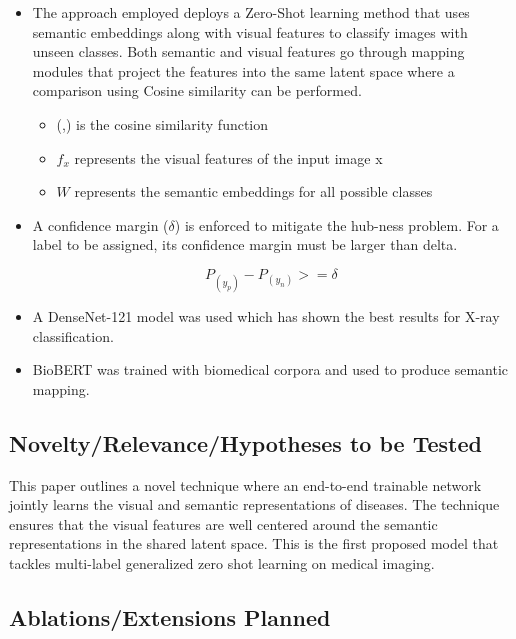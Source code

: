 \documentclass[letterpaper]{article} %
\begin{document}
\begin{itemize}

\item The approach employed deploys a Zero-Shot learning method that uses semantic embeddings along with 
        visual features to classify images with unseen classes. Both semantic and visual features go through mapping modules that project the features into the same latent space where a comparison using Cosine            similarity can be performed.
\begin{itemize}
\[P^x_C = (f_x,W)\]
where
\item (,) is the cosine similarity function
\item \(f_x\) represents the visual features of the input image x
\item \(W\) represents the semantic embeddings for all possible classes


\end{itemize}


\item A confidence margin (\( \delta \)) is enforced to mitigate the hub-ness problem. For a label to be assigned, its 
        confidence margin must be larger than delta. 
    \begin{itemize}

\[P_(y_p) - P_(y_n) >= \delta\ \]

    \end{itemize}
    \item A DenseNet-121 model was used which has shown the best results for X-ray classification.
    \item BioBERT was trained with biomedical corpora and used to produce semantic mapping.
\end{itemize}

\subsection{Novelty/Relevance/Hypotheses to be Tested}

This paper outlines a novel technique where an end-to-end trainable network jointly
learns the visual and semantic representations of diseases. The technique ensures that
the visual features are well centered around the semantic representations in the
shared latent space. This is the first proposed model that tackles multi-label
generalized zero shot learning on medical imaging.

\subsection{Ablations/Extensions Planned}
\end{document}
